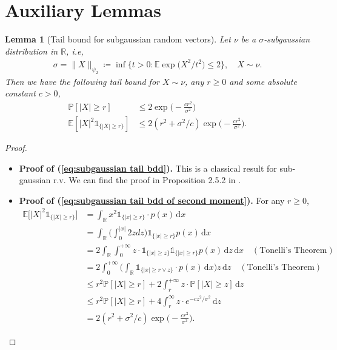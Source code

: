 \documentclass{article}
\newcommand{\ind}{\mathds{1}}
\newcommand{\defn}{\coloneqq}
\newcommand{\diff}{\,\mathrm{d}}
\theoremstyle{plain}
\newtheorem{lemma}{\bf Lemma}
\theoremstyle{remark}
\begin{document}
\section{Auxiliary Lemmas}
\begin{lemma}[Tail bound for subgaussian random vectors]
        \label{lem:tail bdd for subgaussian}
        Let $\nu$ be a $\sigma$-subgaussian distribution in $\mathbb{R}$, i.e, 
    \begin{align}
        \sigma = \| X\|_{\psi_2} \defn \inf \Big\{ t>0: \mathbb{E}\exp \big(X^2/t^2\big) \leq 2\Big\}, \quad X\sim \nu\label{eq:subgaussian def}.
    \end{align}
    Then we have the following tail bound for $X \sim \nu$, any $r\geq 0$ and some absolute constant $c>0$, 
    \begin{align}
        \mathbb{P}[|X| \geq r] &\leq  2\exp\big(-\frac{cr^2}{\sigma^2}\big) \label{eq:subgaussian tail bdd} \\
        \mathbb{E}[|X|^2 \ind_{\{|X|\geq r\}}] & \leq 2 (r^2 + \sigma^2/c) \exp\big(-\frac{cr^2}{\sigma^2}\big) .\label{eq:subgaussian tail bdd of second moment}
    \end{align}
\end{lemma}

\begin{proof}
\begin{itemize}
    \item \textbf{Proof of (\ref{eq:subgaussian tail bdd}).}
    This is a classical result for sub-gaussian r.v. We can find the proof in Proposition 2.5.2 in \cite{Vershynin_2018}. 

\item \textbf{Proof of (\ref{eq:subgaussian tail bdd of second moment}).}
For any $r\geq0$, 
\begin{align*}
    \mathbb{E} \big[ |X|^2\ind_{\{|X|\geq r\}} \big] &= \int_{\mathbb{R}} x^2 \ind_{\{|x|\geq r\}} \cdot p(x) \!\diff x \\
    & = \int_{\mathbb{R}} \Big( \int_0^{|x|} 2z dz\Big) \ind_{\{|x|\geq r\}} p(x) \!\diff x \\
    &= 2\int_{\mathbb{R}}  \int_0^{+\infty} z\cdot \ind_{\{|x|\geq z\}}  \ind_{\{|x|\geq r\}} p(x) \!\diff z \!\diff x \quad (\text{Tonelli's Theorem}) \\
    &= 2\int_0^{+\infty} \Big( \int_{\mathbb{R}}\ind_{\{|x| \geq r\vee z\}}\cdot  p(x) \!\diff x\Big)z \!\diff z \quad (\text{Tonelli's Theorem})\\ 
    & \leq r^2 \mathbb{P}[|X| \geq r] + 2 \int_r^{+\infty} z \cdot \mathbb{P}[|X| \geq z] \!\diff z \\
    &\leq r^2 \mathbb{P}[|X| \geq r] + 4 \int_r^{\infty} z \cdot e^{-cz^2/\sigma^2}  \!\diff z \\
    &= 2 (r^2 + \sigma^2/c) \exp\big(-\frac{cr^2}{\sigma^2}\big) .
\end{align*}
\end{itemize}

\end{proof}
\end{document}
